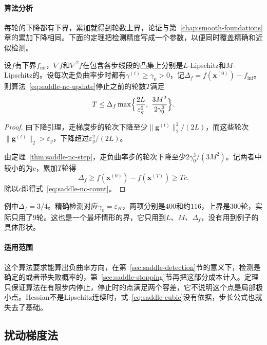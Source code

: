 \paragraph{算法分析}
每轮的下降都有下界，累加就得到轮数上界，论证与第~\ref{chap:smooth-foundations}章的累加下降相同。下面的定理把检测精度写成一个参数，以便同时覆盖精确和近似检测。

\begin{theorem}[交替算法的轮数]
 \label{thm:saddle-nc-count}
 设$f$有下界$f_{\inf}$，$\nabla f$和$\nabla^2f$在包含各步线段的凸集上分别是$L$-Lipschitz和$M$-Lipschitz的。设每次走负曲率步时都有$\gamma^{(t)}\geq\gamma_0>0$，记$\Delta_f=f(\bm{x}^{(0)})-f_{\inf}$。则算法~\eqref{eq:saddle-nc-update}停止之前的轮数$T$满足
 \begin{equation}
  T\leq\Delta_f\max\Bigl\{\frac{2L}{\varepsilon_g^2},\ \frac{3M^2}{2\gamma_0^3}\Bigr\}.
  \label{eq:saddle-nc-count}
 \end{equation}
\end{theorem}

\begin{proof}
 由下降引理，走梯度步的轮次下降至少$\lVert\bm{g}^{(t)}\rVert_2^2/(2L)$，而这些轮次$\lVert\bm{g}^{(t)}\rVert_2>\varepsilon_g$，下降超过$\varepsilon_g^2/(2L)$。

 由定理~\ref{thm:saddle-nc-step}，走负曲率步的轮次下降至少$2\gamma_0^3/(3M^2)$。记两者中较小的为$c$，累加$T$轮得
 \[
  \Delta_f\geq f(\bm{x}^{(0)})-f(\bm{x}^{(T)})\geq Tc.
 \]
 除以$c$即得式~\eqref{eq:saddle-nc-count}。
\end{proof}

例中$\Delta_f=3/4$。精确检测对应$\gamma_0=\varepsilon_H$，两项分别是$400$和约$116$，上界是$300$轮，实际只用了$9$轮。这也是一个最坏情形的界，它只用到$L$、$M$、$\Delta_f$，没有用到例子的具体形状。

\paragraph{适用范围}
这个算法要求能算出负曲率方向，在第~\ref{sec:saddle-detection}节的意义下，检测是确定的或者带失败概率的，第~\ref{sec:saddle-stopping}节再把这部分成本计入。定理只保证算法在有限步内停止，停止时的点满足两个容差，它不说明这个点是局部极小点。Hessian不是Lipschitz连续时，式~\eqref{eq:saddle-cubic}没有依据，步长公式也就失去了基础。

\subsection{扰动梯度法}
\label{sec:saddle-perturbed}

